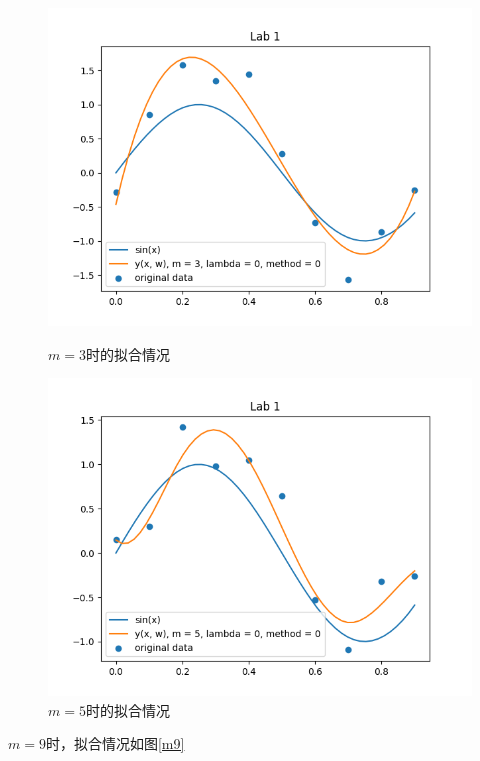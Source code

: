 \begin{figure}
    \begin{minipage}[t]{0.5\linewidth}
        \centering
        \includegraphics[width=\textwidth]{figures/Figure_2.png}
        \caption{$m = 3$时的拟合情况}
        \label{m3}
    \end{minipage}
    \begin{minipage}[t]{0.5\linewidth}
        \centering
        \includegraphics[width=\textwidth]{figures/Figure_3.png}
        \caption{$m = 5$时的拟合情况}
        \label{m5}
    \end{minipage}
\end{figure}

$m = 9$时，拟合情况如图\ref{m9}


